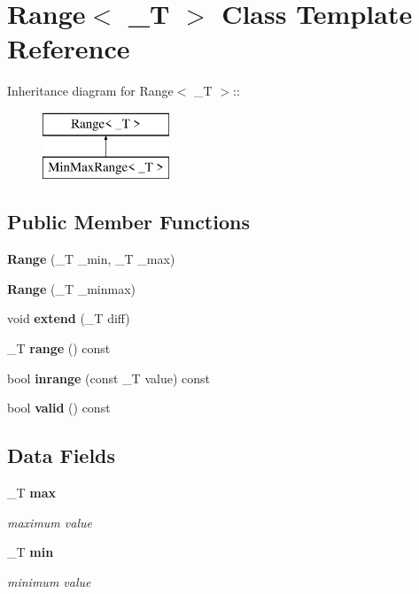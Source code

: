 \section{Range$<$ \_\-T $>$ Class Template Reference}
\label{classRange}
Inheritance diagram for Range$<$ \_\-T $>$::\begin{figure}[H]
\begin{center}
\leavevmode
\includegraphics[height=2cm]{classRange}
\end{center}
\end{figure}
\subsection*{Public Member Functions}
\begin{DoxyCompactItemize}
\item 
{\bfseries Range} (\_\-T \_\-min, \_\-T \_\-max)\label{classRange_aaa73dd31c0c629a02e214f6db438e5e1}

\item 
{\bfseries Range} (\_\-T \_\-minmax)\label{classRange_a09e1bb3d87e276a48a855a22602ef677}

\item 
void {\bfseries extend} (\_\-T diff)\label{classRange_ae24bebe307766cef33c471dc8883b7a0}

\item 
\_\-T {\bfseries range} () const \label{classRange_ad24d5d2bcbcaf468dbc9b639cb66ca2c}

\item 
bool {\bfseries inrange} (const \_\-T value) const \label{classRange_aa775f3e2c83c494507c17b9938f04a44}

\item 
bool {\bfseries valid} () const \label{classRange_abdc59f930d73c924f28ba23b83b3ac41}

\end{DoxyCompactItemize}
\subsection*{Data Fields}
\begin{DoxyCompactItemize}
\item 
\_\-T {\bf max}\label{classRange_a3f5b42cf64810fc334f805fd6f146197}

\begin{DoxyCompactList}\small\item\em maximum value \item\end{DoxyCompactList}\item 
\_\-T {\bf min}\label{classRange_ab7904596c5b8a52eb5e6671ed8ca942d}

\begin{DoxyCompactList}\small\item\em minimum value \item\end{DoxyCompactList}\end{DoxyCompactItemize}


